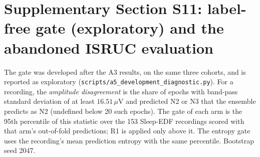 \documentclass[10pt,a4paper]{article}
\begin{document}
\section*{Supplementary Section S11: label-free gate (exploratory) and the abandoned ISRUC evaluation}
\label{sec:sup_gate}

The gate was developed after the A3 results, on the same three cohorts, and is reported as exploratory
(\nolinkurl{scripts/a5_development_diagnostic.py}). For a recording, the \emph{amplitude disagreement} is the
share of epochs with band-pass standard deviation of at least $16.51\,\mu$V and predicted N2 or N3 that the
ensemble predicts as N2 (undefined below 20 such epochs). The gate of each arm is the 95th percentile of this
statistic over the 153 Sleep-EDF recordings scored with that arm's out-of-fold predictions; R1 is applied only above
it. The entropy gate uses the recording's mean prediction entropy with the same percentile. Bootstrap seed 2047.
\end{document}
